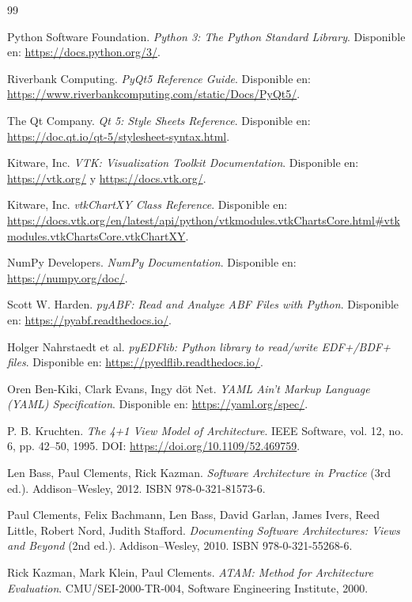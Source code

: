 \documentclass[11pt,a4paper]{article}
\DeclareRobustCommand{\_}{\textunderscore\allowbreak}
\begin{document}
\begin{thebibliography}{99}

 Python Software Foundation. \textit{Python 3: The Python Standard Library}. Disponible en: \url{https://docs.python.org/3/}.

 Riverbank Computing. \textit{PyQt5 Reference Guide}. Disponible en: \url{https://www.riverbankcomputing.com/static/Docs/PyQt5/}.

 The Qt Company. \textit{Qt 5: Style Sheets Reference}. Disponible en: \url{https://doc.qt.io/qt-5/stylesheet-syntax.html}.

 Kitware, Inc. \textit{VTK: Visualization Toolkit Documentation}. Disponible en: \url{https://vtk.org/} y \url{https://docs.vtk.org/}.

 Kitware, Inc. \textit{vtkChartXY Class Reference}. Disponible en: \url{https://docs.vtk.org/en/latest/api/python/vtkmodules.vtkChartsCore.html\#vtkmodules.vtkChartsCore.vtkChartXY}.

 NumPy Developers. \textit{NumPy Documentation}. Disponible en: \url{https://numpy.org/doc/}.

 Scott W. Harden. \textit{pyABF: Read and Analyze ABF Files with Python}. Disponible en: \url{https://pyabf.readthedocs.io/}.

 Holger Nahrstaedt et al. \textit{pyEDFlib: Python library to read/write EDF+/BDF+ files}. Disponible en: \url{https://pyedflib.readthedocs.io/}.

 Oren Ben-Kiki, Clark Evans, Ingy d\"ot Net. \textit{YAML Ain't Markup Language (YAML) Specification}. Disponible en: \url{https://yaml.org/spec/}.

 P. B. Kruchten. \textit{The 4+1 View Model of Architecture}. IEEE Software, vol. 12, no. 6, pp. 42--50, 1995. DOI: \url{https://doi.org/10.1109/52.469759}.

 Len Bass, Paul Clements, Rick Kazman. \textit{Software Architecture in Practice} (3rd ed.). Addison--Wesley, 2012. ISBN 978-0-321-81573-6.

 Paul Clements, Felix Bachmann, Len Bass, David Garlan, James Ivers, Reed Little, Robert Nord, Judith Stafford. \textit{Documenting Software Architectures: Views and Beyond} (2nd ed.). Addison--Wesley, 2010. ISBN 978-0-321-55268-6.

 Rick Kazman, Mark Klein, Paul Clements. \textit{ATAM: Method for Architecture Evaluation}. CMU/SEI-2000-TR-004, Software Engineering Institute, 2000.


\end{thebibliography}
\end{document}

